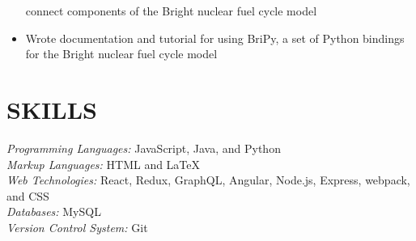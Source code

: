 \documentclass[line,margin,letterpaper]{res}
\begin{document}
\begin{resume}
\begin{itemize}
    connect components of the Bright nuclear fuel cycle model
    \item Wrote documentation and tutorial for using BriPy, a set of Python
    bindings for the Bright nuclear fuel cycle model
  \end{itemize}
 

\section{SKILLS}
  \emph{Programming Languages:} JavaScript, Java, and Python\\
  \emph{Markup Languages:} HTML and \LaTeX \\
  \emph{Web Technologies:} React, Redux, GraphQL, Angular, Node.js,
  Express, webpack, and CSS \\
  \emph{Databases:} MySQL \\
  \emph{Version Control System:} Git \\
\end{resume}
\end{document}
